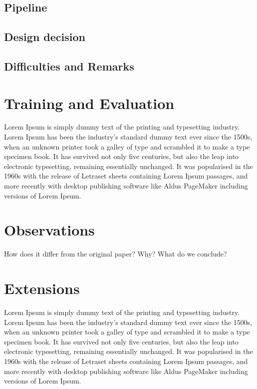 \documentclass[letterpaper, 10 pt, conference]{ieeeconf}  %
\begin{document}
\subsection{Pipeline}
\subsection{Design decision}
\subsection{Difficulties and Remarks}






\section{Training and Evaluation }

Lorem Ipsum is simply dummy text of the printing and typesetting industry. Lorem Ipsum has been the industry's standard dummy text ever since the 1500s, when an unknown printer took a galley of type and scrambled it to make a type specimen book. It has survived not only five centuries, but also the leap into electronic typesetting, remaining essentially unchanged. It was popularised in the 1960s with the release of Letraset sheets containing Lorem Ipsum passages, and more recently with desktop publishing software like Aldus PageMaker including versions of Lorem Ipsum.





\section{Observations}

 How does it differ from the original paper? Why? What do we conclude?






\section{Extensions}

Lorem Ipsum is simply dummy text of the printing and typesetting industry. Lorem Ipsum has been the industry's standard dummy text ever since the 1500s, when an unknown printer took a galley of type and scrambled it to make a type specimen book. It has survived not only five centuries, but also the leap into electronic typesetting, remaining essentially unchanged. It was popularised in the 1960s with the release of Letraset sheets containing Lorem Ipsum passages, and more recently with desktop publishing software like Aldus PageMaker including versions of Lorem Ipsum.
\end{document}

